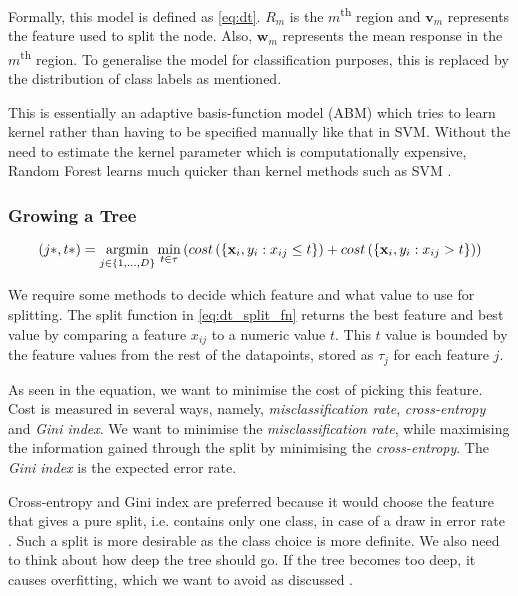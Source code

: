Formally, this model is defined as \autoref{eq:dt}. $R_m$ is the $m$\textsuperscript{th} region and $\mathbf{v}_m$ represents the feature used to split the node. Also, $\mathbf{w}_m$ represents the mean response in the $m$\textsuperscript{th} region. To generalise the model for classification purposes, this is replaced by the distribution of class labels as mentioned.

This is essentially an adaptive basis-function model (ABM) which tries to learn kernel rather than having to be specified manually like that in SVM. Without the need to estimate the kernel parameter which is computationally expensive, Random Forest learns much quicker than kernel methods such as SVM \cite{mur-book}. 

\subsubsection{Growing a Tree}
\begin{equation} \label{eq:dt_split_fn}
  (j*, t*) = \operatornamewithlimits{argmin}_{j \in \{1, ...,D\}} \operatornamewithlimits{min}_{t \in \tau} 
  \left( 
    cost \left(\{\mathbf{x}_i, y_i : x_{ij} \leq t \}\right) +
    cost \left(\{\mathbf{x}_i, y_i : x_{ij} > t\}\right)
  \right)
\end{equation}

We require some methods to decide which feature and what value to use for splitting. The split function in \autoref{eq:dt_split_fn} returns the best feature and best value by comparing a feature $x_{ij}$ to a numeric value $t$. This $t$ value is bounded by the feature values from the rest of the datapoints, stored as $\tau_{j}$ for each feature $j$.

As seen in the equation, we want to minimise the cost of picking this feature. Cost is measured in several ways, namely, \textit{misclassification rate}, \textit{cross-entropy} and \textit{Gini index}. We want to minimise the \textit{misclassification rate}, while maximising the information gained through the split by minimising the \textit{cross-entropy}. The \textit{Gini index} is the expected error rate. 

Cross-entropy and Gini index are preferred because it would choose the feature that gives a pure split, i.e. contains only one class, in case of a draw in error rate \cite{mur-book}. Such a split is more desirable as the class choice is more definite. We also need to think about how deep the tree should go. If the tree becomes too deep, it causes overfitting, which we want to avoid as discussed \cite{mur-book}. 

